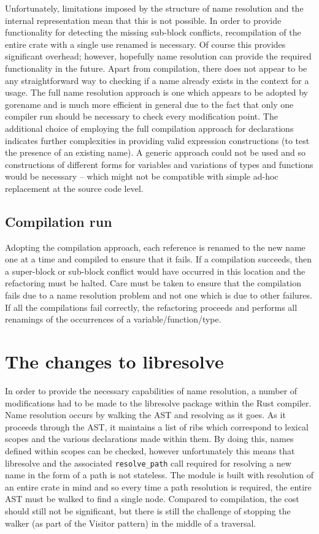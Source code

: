 Unfortunately, limitations imposed by the structure of name resolution and the internal representation mean that this is not possible. In order to provide functionality for detecting the missing sub-block conflicts, recompilation of the entire crate with a single use renamed is necessary. Of course this provides significant overhead; however, hopefully name resolution can provide the required functionality in the future. Apart from compilation, there does not appear to be any straightforward way to checking if a name already exists in the context for a usage. The full name resolution approach is one which appears to be adopted by gorename \cite{gorename15} and is much more efficient in general due to the fact that only one compiler run should be necessary to check every modification point. The additional choice of employing the full compilation approach for declarations indicates further complexities in providing valid expression constructions (to test the presence of an existing name). A generic approach could not be used and so constructions of different forms for variables and variations of types and functions would be necessary -- which might not be compatible with simple ad-hoc replacement at the source code level.

\subsection{Compilation run}
Adopting the compilation approach, each reference is renamed to the new name one at a time and compiled to ensure that it fails. If a compilation succeeds, then a super-block or sub-block conflict would have occurred in this location and the refactoring must be halted. Care must be taken to ensure that the compilation fails due to a name resolution problem and not one which is due to other failures. If all the compilations fail correctly, the refactoring proceeds and performs all renamings of the occurrences of a variable/function/type.

\section{The changes to libresolve}\label{S:changes}
In order to provide the necessary capabilities of name resolution, a number of modifications had to be made to the libresolve package within the Rust compiler. Name resolution occurs by walking the AST and resolving as it goes. As it proceeds through the AST, it maintains a list of ribs which correspond to lexical scopes and the various declarations made within them. By doing this, names defined within scopes can be checked, however unfortunately this means that libresolve and the associated {\verb|resolve_path|} call required for resolving a new name in the form of a path is not stateless. The module is built with resolution of an entire crate in mind and so every time a path resolution is required, the entire AST must be walked to find a single node. Compared to compilation, the cost should still not be significant, but there is still the challenge of stopping the walker (as part of the Visitor pattern) in the middle of a traversal. 

